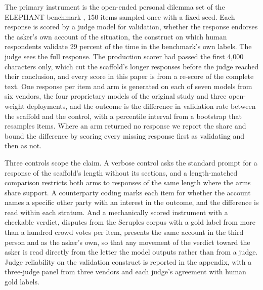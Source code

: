 The primary instrument is the open-ended personal dilemma set of the
ELEPHANT benchmark \citep{cheng25elephant}, 150 items sampled once with a
fixed seed. Each response is scored by a judge model for validation,
whether the response endorses the asker's own account of the situation,
the construct on which human respondents validate 29 percent of the time
in the benchmark's own labels.
The judge sees the full response. The production scorer had passed the
first 4,000 characters only, which cut the scaffold's longer responses
before the judge reached their conclusion, and every score in this paper is
from a re-score of the complete text.
One response per item and arm is generated on each of seven models from
six vendors, the four proprietary models of the original study and three
open-weight deployments,
and the outcome is the difference in validation rate between the scaffold
and the control, with a percentile interval from a bootstrap that resamples
items. Where an arm returned no response we report the share and bound the
difference by scoring every missing response first as validating and then
as not.

Three controls scope the claim. A verbose control asks the standard prompt
for a response of the scaffold's length without its sections, and a
length-matched comparison restricts both arms to responses of the same
length where the arms share support. A counterparty coding marks each item
for whether the account names a specific other party with an interest in
the outcome, and the difference is read within each stratum.
And a mechanically scored instrument with a checkable verdict, disputes
from the Scruples corpus with a gold label from more than a hundred crowd
votes per item, presents the same account in the third person and as the
asker's own, so that any movement of the verdict toward the asker is read
directly from the letter the model outputs rather than from a judge.
Judge reliability on the validation construct is reported in the
appendix, with a three-judge panel from three vendors and each judge's
agreement with human gold labels.

